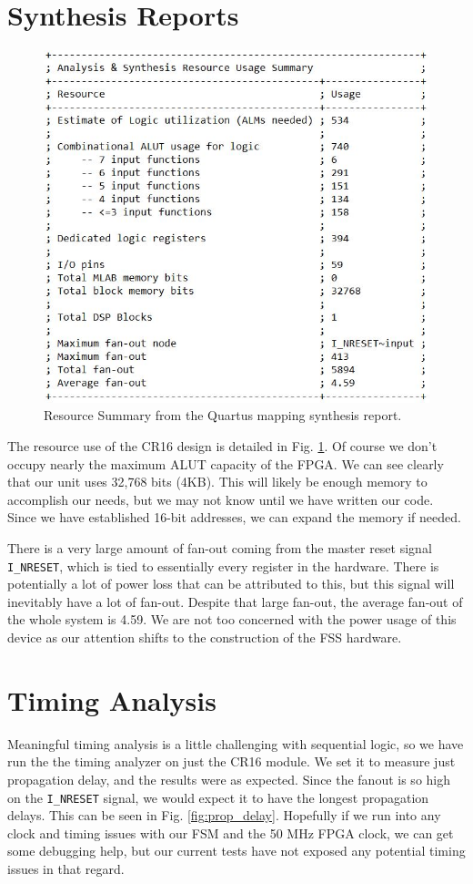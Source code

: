 \documentclass[conference]{IEEEtran}
\begin{document}
\section{Synthesis Reports}
\begin{figure}[t]
    \centering
    \includegraphics[scale=0.65]{resources/figures/resource_summary.jpg}
    \caption{Resource Summary from the Quartus mapping synthesis report.}
    \label{fig:resource_summary}
\end{figure}

The resource use of the CR16 design is detailed in Fig. \ref{fig:resource_summary}. Of course we don't occupy nearly the maximum ALUT capacity of the FPGA. We can see clearly that our unit uses 32,768 bits (4KB). This will likely be enough memory to accomplish our needs, but we may not know until we have written our code. Since we have established 16-bit addresses, we can expand the memory if needed.

There is a very large amount of fan-out coming from the master reset signal \verb|I_NRESET|, which is tied to essentially every register in the hardware. There is potentially a lot of power loss that can be attributed to this, but this signal will inevitably have a lot of fan-out. Despite that large fan-out, the average fan-out of the whole system is 4.59. We are not too concerned with the power usage of this device as our attention shifts to the construction of the FSS hardware.
\section{Timing Analysis}
Meaningful timing analysis is a little challenging with sequential logic, so we have run the the timing analyzer on just the CR16 module. We set it to measure just propagation delay, and the results were as expected. Since the fanout is so high on the \verb|I_NRESET| signal, we would expect it to have the longest propagation delays. This can be seen in Fig. \ref{fig:prop_delay}. Hopefully if we run into any clock and timing issues with our FSM and the 50 MHz FPGA clock, we can get some debugging help, but our current tests have not exposed any potential timing issues in that regard.
\end{document}

